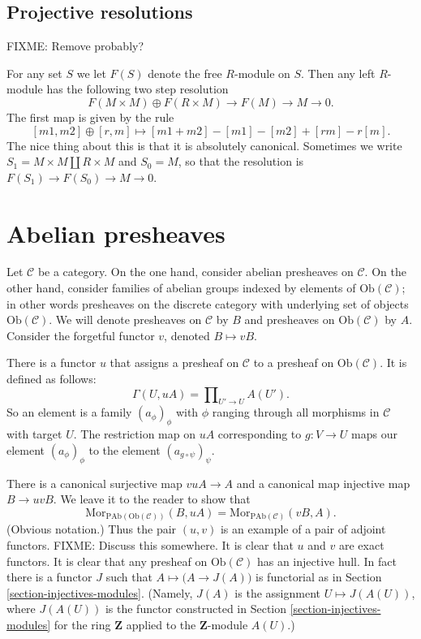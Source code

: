 \subsection{Projective resolutions}
\label{subsection-projective-resolution}

\noindent
FIXME: Remove probably?

\noindent
For any set $S$ we let $F(S)$ denote the free $R$-module on $S$.
Then any left $R$-module has the following two step resolution
$$
F(M\times M) \oplus F(R\times M) \to F(M) \to M \to 0.
$$
The first map is given by the rule
$$
[m1,m2] \oplus [r,m] \mapsto [m1+m2]-[m1]-[m2]+[rm]-r[m].
$$
The nice thing about this is that it is absolutely canonical.
Sometimes we write $S_1 = M\times M \coprod R\times M$ and
$S_0=M$, so that the resolution is $F(S_1) \to F(S_0) \to M \to 0$.

\section{Abelian presheaves}
\label{section-injectives-presheaves}

\noindent
Let $\mathcal{C}$ be a category. On the one hand, consider abelian
presheaves on $\mathcal{C}$. On the other hand, consider
families of abelian groups indexed by elements of
$\text{Ob}(\mathcal{C})$; in other words presheaves on the discrete
category with underlying set of objects $\text{Ob}(\mathcal{C})$.
We will denote presheaves on $\mathcal{C}$ by $B$ and presheaves on
$\text{Ob}(\mathcal{C})$ by $A$. Consider the forgetful functor $v$,
denoted $B \mapsto vB$.

\medskip\noindent
There is a functor $u$ that assigns a presheaf on $\mathcal{C}$
to a presheaf on $\text{Ob}(\mathcal{C})$. It is defined as follows:
$$
\Gamma(U, uA) = \prod\nolimits_{U' \to U} A(U').
$$
So an element is a family $(a_\phi)_\phi$ with $\phi$
ranging through all morphisms in $\mathcal{C}$ with target $U$.
The restriction map on $uA$ corresponding to $g : V \to U$
maps our element $(a_\phi)_\phi$ to the element 
$(a_{g \circ \psi})_\psi$. 

\medskip\noindent
There is a canonical surjective map $vuA \to A$ and a canonical map
injective map $B \to uvB$. We leave it to the reader to show that
$$
\text{Mor}_{\text{PAb}(\text{Ob}(\mathcal{C}))}(B, uA) =
\text{Mor}_{\text{PAb}(\mathcal{C})}(vB, A).
$$
(Obvious notation.) Thus the pair $(u,v)$ is an example of a pair of adjoint
functors. FIXME: Discuss this somewhere. It is clear that $u$ and $v$ are exact 
functors. It is clear that any presheaf on $\text{Ob}(\mathcal{C})$ has an
injective hull. In fact there is a functor $J$ such that
$A \mapsto \big(A \to J(A)\big)$ is functorial as in
Section \ref{section-injectives-modules}.
(Namely, $J(A)$ is the assignment $U\mapsto J(A(U))$, where
$J(A(U))$ is the functor constructed in
Section \ref{section-injectives-modules} for the ring $\mathbf{Z}$
applied to the $\mathbf{Z}$-module $A(U)$.)

